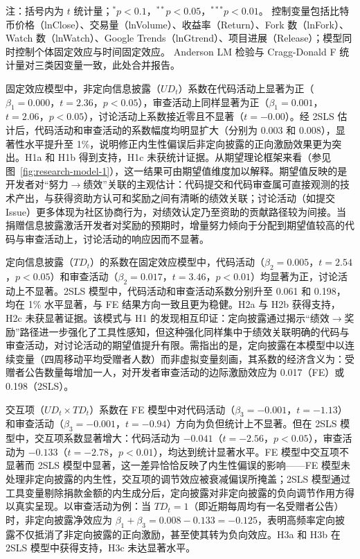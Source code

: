 \begin{table}[htbp]
\begin{tabularx}{\textwidth}{Xrrrrrr}
        \bottomrule
    \end{tabularx}
    \begin{minipage}{\textwidth}
        \vspace{0.3em}
        \footnotesize 注：括号内为 $t$ 统计量；$^{*}p<0.1$，$^{**}p<0.05$，$^{***}p<0.01$。
        控制变量包括比特币价格（lnClose）、交易量（lnVolume）、收益率（Return）、Fork 数（lnFork）、Watch 数（lnWatch）、Google Trends（lnGtrend）、项目进展（Release）；模型同时控制个体固定效应与时间固定效应。
        Anderson LM 检验与 Cragg-Donald F 统计量对三类因变量一致，此处合并报告。
    \end{minipage}
\end{table}

固定效应模型中，非定向信息披露（$UD_t$）系数在代码活动上显著为正（$\beta_1 = 0.000$，$t = 2.36$，$p < 0.05$），审查活动上同样显著为正（$\beta_1 = 0.001$，$t = 2.06$，$p < 0.05$），讨论活动上系数接近零且不显著（$t = -0.00$）。经 2SLS 估计后，代码活动和审查活动的系数幅度均明显扩大（分别为 0.003 和 0.008），显著性水平提升至 1\%，说明修正内生性偏误后非定向披露的正向激励效果更为突出。H1a 和 H1b 得到支持，H1c 未获统计证据。从期望理论框架来看（参见图~\ref{fig:research-model-1}），这一结果可由期望值维度加以解释。期望值反映的是开发者对“努力$\to$绩效”关联的主观估计：代码提交和代码审查属可直接观测的技术产出，与获得资助方认可和奖励之间有清晰的绩效关联；讨论活动（如提交 Issue）更多体现为社区协商行为，对绩效认定乃至资助的贡献路径较为间接。当捐赠信息披露激活开发者对奖励的预期时，增量努力倾向于分配到期望值较高的代码与审查活动上，讨论活动的响应因而不显著。

定向信息披露（$TD_t$）的系数在固定效应模型中，代码活动（$\beta_2 = 0.005$，$t = 2.54$，$p < 0.05$）和审查活动（$\beta_2 = 0.017$，$t = 3.46$，$p < 0.01$）均显著为正，讨论活动上不显著。2SLS 模型中，代码活动和审查活动系数分别升至 0.061 和 0.198，均在 1\% 水平显著，与 FE 结果方向一致且更为稳健。H2a 与 H2b 获得支持，H2c 未获显著证据。该模式与 H1 的发现相互印证：定向披露通过揭示“绩效$\to$奖励”路径进一步强化了工具性感知，但这种强化同样集中于绩效关联明确的代码与审查活动，对讨论活动的期望值提升有限。需指出的是，定向披露在本模型中以连续变量（四周移动平均受赠者人数）而非虚拟变量刻画，其系数的经济含义为：受赠者公告数量每增加一人，对开发者审查活动的边际激励效应为 0.017（FE）或 0.198（2SLS）。

交互项（$UD_t \times TD_t$）系数在 FE 模型中对代码活动（$\beta_3 = -0.001$，$t = -1.13$）和审查活动（$\beta_3 = -0.001$，$t = -0.94$）方向为负但统计上不显著。但在 2SLS 模型中，交互项系数显著增大：代码活动为 $-0.041$（$t = -2.56$，$p < 0.05$），审查活动为 $-0.133$（$t = -2.78$，$p < 0.01$），均达到统计显著水平。FE 模型中交互项不显著而 2SLS 模型中显著，这一差异恰恰反映了内生性偏误的影响——FE 模型未处理非定向披露的内生性，交互项的调节效应被衰减偏误所掩盖；2SLS 模型通过工具变量剔除捐款金额的内生成分后，定向披露对非定向披露的负向调节作用方得以真实呈现。以审查活动为例：当 $TD_t = 1$（即近期每周均有一名受赠者公告）时，非定向披露净效应为 $\beta_1 + \beta_3 = 0.008 - 0.133 = -0.125$，表明高频率定向披露不仅抵消了非定向披露的正向激励，甚至使其转为负向效应。H3a 和 H3b 在 2SLS 模型中获得支持，H3c 未达显著水平。

